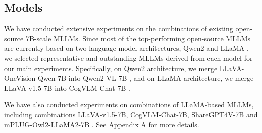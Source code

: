 \subsection{Models} \label{models}

We have conducted extensive experiments on the combinations of existing open-source 7B-scale MLLMs. 
Since most of the top-performing open-source MLLMs are currently based on two language model architectures, Qwen2 \cite{qwen2} and LLaMA \cite{llama}, we selected representative and outstanding MLLMs derived from each model for our main experiments.
Specifically, on Qwen2 architecture, we merge LLaVA-OneVision-Qwen-7B \cite{llava-onevison} into Qwen2-VL-7B \cite{qwen2-vl}, and on LLaMA architecture, we merge LLaVA-v1.5-7B \cite{llava1.5} into CogVLM-Chat-7B \cite{cogvlm}.

We have also conducted experiments on combinations of LLaMA-based MLLMs, including combinations LLaVA-v1.5-7B, CogVLM-Chat-7B, ShareGPT4V-7B \cite{sharegpt4v} and mPLUG-Owl2-LLaMA2-7B \cite{mplugowl2}.
See Appendix A for more details. %











